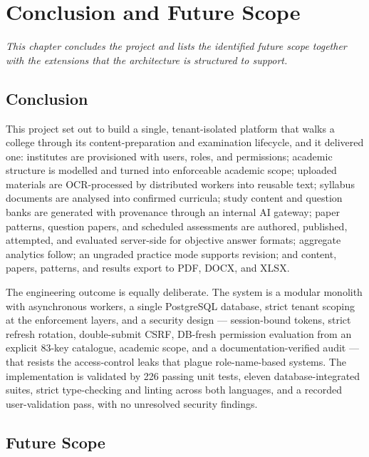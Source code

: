 \chapter{Conclusion and Future Scope}
\label{ch:conclusion}

\begin{center}
\textit{This chapter concludes the project and lists the identified future
scope together with the extensions that the architecture is structured to
support.}
\end{center}

\vspace*{\fill}
\clearpage
\section{Conclusion}

\noindent This project set out to build a single, tenant-isolated platform that
walks a college through its content-preparation and examination lifecycle, and
it delivered one: institutes are provisioned with users, roles, and
permissions; academic structure is modelled and turned into enforceable
academic scope; uploaded materials are OCR-processed by distributed workers
into reusable text; syllabus documents are analysed into confirmed
curricula; study content and question banks are generated with provenance
through an internal AI gateway; paper patterns, question papers, and
scheduled assessments are authored, published, attempted, and evaluated
server-side for objective answer formats; aggregate analytics follow; an
ungraded practice mode supports revision; and content, papers, patterns, and
results export to PDF, DOCX, and XLSX.

The engineering outcome is equally deliberate. The system is a modular
monolith with asynchronous workers, a single PostgreSQL database, strict
tenant scoping at the enforcement layers, and a security design ---
session-bound tokens, strict refresh rotation, double-submit CSRF, DB-fresh
permission evaluation from an explicit 83-key catalogue, academic scope, and a
documentation-verified audit --- that resists the access-control leaks that
plague role-name-based systems. The implementation is validated by 226
passing unit tests, eleven database-integrated suites, strict type-checking
and linting across both languages, and a recorded user-validation pass, with
no unresolved security findings.

\section{Future Scope}

